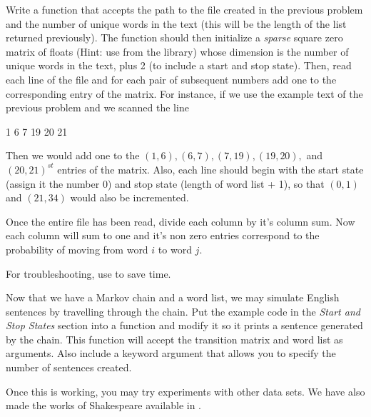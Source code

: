 \begin{problem}
Write a function that accepts the path to the file created in the previous problem and the number of unique words in the text (this will be the length of the list returned previously).
The function should then initialize a \emph{sparse} square zero matrix of floats (Hint: use  from the  library) whose dimension is the number of unique words in the text, plus 2 (to include a start and stop state).
Then, read each line of the file and for each pair of subsequent numbers add one to the corresponding entry of the matrix.
For instance, if we use the example text of the previous problem and we scanned the line

1 6 7 19 20 21

Then we would add one to the $(1,6), (6,7), (7,19), (19,20),$ and $(20,21)^{st}$ entries of the matrix.
Also, each line should begin with the start state (assign it the number 0) and stop state (length of word list + 1), so that $(0,1)$ and $(21,34)$ would also be incremented.

Once the entire file has been read, divide each column by it's column sum.
Now each column will sum to one and it's non zero entries correspond to the probability of moving from word $i$ to word $j$.

For troubleshooting, use  to save time.
\end{problem}

\begin{problem}
Now that we have a Markov chain and a word list, we may simulate English sentences by travelling through the chain.
Put the example code in the \emph{Start and Stop States} section into a function and modify it so it prints a sentence generated by the chain.
This function will accept the transition matrix and word list as arguments.
Also include a keyword argument that allows you to specify the number of sentences created.

Once this is working, you may try experiments with other data sets.
We have also made the works of Shakespeare available in .
\end{problem}

